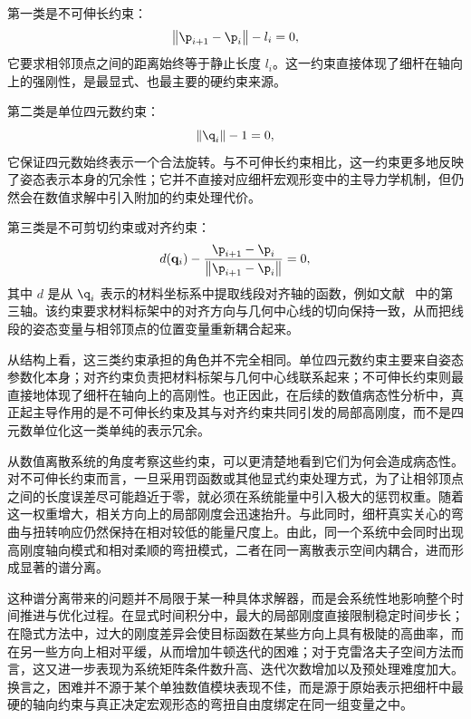 第一类是不可伸长约束：
\begin{equation}
  \left\| \p_{i+1} - \p_i \right\| - l_i = 0,
  \label{eq: inext_cons_d}
\end{equation}
它要求相邻顶点之间的距离始终等于静止长度 $l_i$。这一约束直接体现了细杆在轴向上的强刚性，是最显式、也最主要的硬约束来源。

第二类是单位四元数约束：
\begin{equation}
  \left\| \q_i  \right\| - 1 = 0,
  \label{eq: unitq_cons}
\end{equation}
它保证四元数始终表示一个合法旋转。与不可伸长约束相比，这一约束更多地反映了姿态表示本身的冗余性；它并不直接对应细杆宏观形变中的主导力学机制，但仍然会在数值求解中引入附加的约束处理代价。

第三类是不可剪切约束或对齐约束：
\begin{equation}
  d(\mathbf q_i) - \frac{\p_{i+1} - \p_i}{\left\| \p_{i+1} - \p_i\right\|} = 0,
  \label{eq: alignment_cons}
\end{equation}
其中 $d$ 是从 $\q_i$ 表示的材料坐标系中提取线段对齐轴的函数，例如文献~\cite{spillmann_corde_2007} 中的第三轴。该约束要求材料标架中的对齐方向与几何中心线的切向保持一致，从而把线段的姿态变量与相邻顶点的位置变量重新耦合起来。

从结构上看，这三类约束承担的角色并不完全相同。单位四元数约束主要来自姿态参数化本身；对齐约束负责把材料标架与几何中心线联系起来；不可伸长约束则最直接地体现了细杆在轴向上的高刚性。也正因此，在后续的数值病态性分析中，真正起主导作用的是不可伸长约束及其与对齐约束共同引发的局部高刚度，而不是四元数单位化这一类单纯的表示冗余。

从数值离散系统的角度考察这些约束，可以更清楚地看到它们为何会造成病态性。对不可伸长约束而言，一旦采用罚函数或其他显式约束处理方式，为了让相邻顶点之间的长度误差尽可能趋近于零，就必须在系统能量中引入极大的惩罚权重。随着这一权重增大，相关方向上的局部刚度会迅速抬升。与此同时，细杆真实关心的弯曲与扭转响应仍然保持在相对较低的能量尺度上。由此，同一个系统中会同时出现高刚度轴向模式和相对柔顺的弯扭模式，二者在同一离散表示空间内耦合，进而形成显著的谱分离。

这种谱分离带来的问题并不局限于某一种具体求解器，而是会系统性地影响整个时间推进与优化过程。在显式时间积分中，最大的局部刚度直接限制稳定时间步长；在隐式方法中，过大的刚度差异会使目标函数在某些方向上具有极陡的高曲率，而在另一些方向上相对平缓，从而增加牛顿迭代的困难；对于克雷洛夫子空间方法而言，这又进一步表现为系统矩阵条件数升高、迭代次数增加以及预处理难度加大。换言之，困难并不源于某个单独数值模块表现不佳，而是源于原始表示把细杆中最硬的轴向约束与真正决定宏观形态的弯扭自由度绑定在同一组变量之中。

